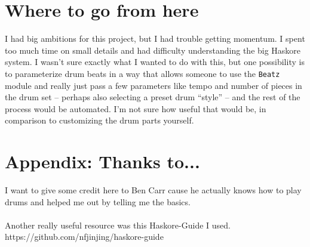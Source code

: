 \documentclass{article}
\begin{document}
\section*{Where to go from here}
\indent I had big ambitions for this project, but I had trouble getting momentum. 
I spent too much time on small details and had difficulty understanding the big
Haskore system. I wasn't sure exactly what I wanted to do with this, but one 
possibility is to parameterize drum beats in a way that allows someone to use the 
\lstinline{Beatz} module and really just pass a few parameters like tempo and
number of pieces in the drum set -- perhaps also selecting a preset drum ``style''
-- and the rest of the process would be automated. I'm not sure how useful that
would be, in comparison to customizing the drum parts yourself.

\pagebreak

\section*{Appendix: Thanks to...}
I want to give some credit here to Ben Carr cause he actually knows how to 
play drums and helped me out by telling me the basics.\\
\\
Another really useful resource was this Haskore-Guide I used.\\
https://github.com/nfjinjing/haskore-guide
\end{document}
